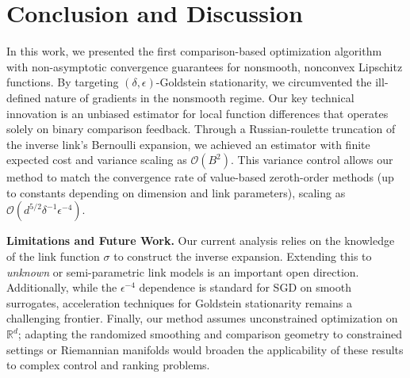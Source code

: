 \documentclass[11pt]{article}
\theoremstyle{plain}
\theoremstyle{remark}
\newcommand{\1}{\mathbf{1}}
\begin{document}
\section{Conclusion and Discussion}

In this work, we presented the first comparison-based optimization algorithm with non-asymptotic convergence guarantees for nonsmooth, nonconvex Lipschitz functions. By targeting $(\delta, \epsilon)$-Goldstein stationarity, we circumvented the ill-defined nature of gradients in the nonsmooth regime. Our key technical innovation is an unbiased estimator for local function differences that operates solely on binary comparison feedback. Through a Russian-roulette truncation of the inverse link's Bernoulli expansion, we achieved an estimator with finite expected cost and variance scaling as $\mathcal{O}(B^2)$. This variance control allows our method to match the convergence rate of value-based zeroth-order methods (up to constants depending on dimension and link parameters), scaling as $\mathcal{O}(d^{5/2}\delta^{-1}\epsilon^{-4})$.

\textbf{Limitations and Future Work.}
Our current analysis relies on the knowledge of the link function $\sigma$ to construct the inverse expansion. Extending this to \emph{unknown} or semi-parametric link models is an important open direction. Additionally, while the $\epsilon^{-4}$ dependence is standard for SGD on smooth surrogates, acceleration techniques for Goldstein stationarity remains a challenging frontier. Finally, our method assumes unconstrained optimization on $\mathbb{R}^d$; adapting the randomized smoothing and comparison geometry to constrained settings or Riemannian manifolds would broaden the applicability of these results to complex control and ranking problems.


\end{document}
